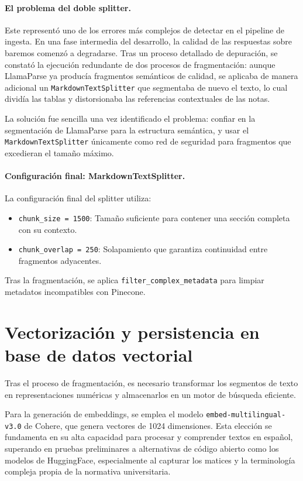 \documentclass[12pt,a4paper,oneside]{report}
\begin{document}
\paragraph{El problema del doble splitter.} Este representó uno de los errores más complejos de detectar en el pipeline de ingesta. En una fase intermedia del desarrollo, la calidad de las respuestas sobre baremos comenzó a degradarse. Tras un proceso detallado de depuración, se constató la ejecución redundante de dos procesos de fragmentación: aunque LlamaParse ya producía fragmentos semánticos de calidad, se aplicaba de manera adicional un \texttt{Mark\-down\-Text\-Split\-ter} que segmentaba de nuevo el texto, lo cual dividía las tablas y distorsionaba las referencias contextuales de las notas.

La solución fue sencilla una vez identificado el problema: confiar en la segmentación de LlamaParse para la estructura semántica, y usar el \texttt{Mark\-down\-Text\-Split\-ter} únicamente como red de seguridad para fragmentos que excedieran el tamaño máximo.

\paragraph{Configuración final: MarkdownTextSplitter.} La configuración final del splitter utiliza:
\begin{itemize}
    \item \texttt{chunk\_size = 1500}: Tamaño suficiente para contener una sección completa con su contexto.
    \item \texttt{chunk\_overlap = 250}: Solapamiento que garantiza continuidad entre fragmentos adyacentes.
\end{itemize}

Tras la fragmentación, se aplica \texttt{filter\_complex\_metadata} para limpiar metadatos incompatibles con Pinecone.

\section{Vectorización y persistencia en base de datos vectorial}

Tras el proceso de fragmentación, es necesario transformar los segmentos de texto en representaciones numéricas y almacenarlos en un motor de búsqueda eficiente.

Para la generación de embeddings, se emplea el modelo \texttt{embed-multilingual-v3.0} de Cohere, que genera vectores de 1024 dimensiones. Esta elección se fundamenta en su alta capacidad para procesar y comprender textos en español, superando en pruebas preliminares a alternativas de código abierto como los modelos de HuggingFace, especialmente al capturar los matices y la terminología compleja propia de la normativa universitaria.
\end{document}
